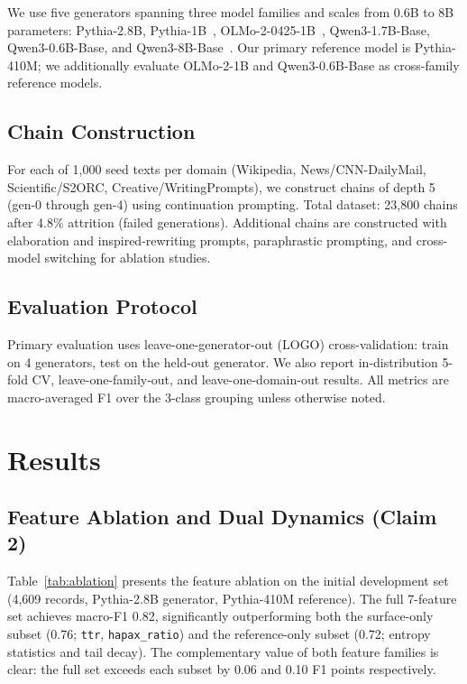 \documentclass[letterpaper]{article}
\newcommand{\feat}[1]{\texttt{#1}}
\begin{document}
We use five generators spanning three model families and scales from 0.6B to 8B parameters: Pythia-2.8B, Pythia-1B~\citep{biderman2023pythia}, OLMo-2-0425-1B~\citep{groeneveld2024olmo}, Qwen3-1.7B-Base, Qwen3-0.6B-Base, and Qwen3-8B-Base~\citep{yang2024qwen2}.
Our primary reference model is Pythia-410M; we additionally evaluate OLMo-2-1B and Qwen3-0.6B-Base as cross-family reference models.

\subsection{Chain Construction}

For each of 1{,}000 seed texts per domain (Wikipedia, News/CNN-DailyMail, Scientific/S2ORC, Creative/WritingPrompts), we construct chains of depth 5 (gen-0 through gen-4) using continuation prompting.
Total dataset: 23{,}800 chains after 4.8\% attrition (failed generations).
Additional chains are constructed with elaboration and inspired-rewriting prompts, paraphrastic prompting, and cross-model switching for ablation studies.

\subsection{Evaluation Protocol}

Primary evaluation uses leave-one-generator-out (LOGO) cross-validation: train on 4 generators, test on the held-out generator.
We also report in-distribution 5-fold CV, leave-one-family-out, and leave-one-domain-out results.
All metrics are macro-averaged F1 over the 3-class grouping unless otherwise noted.

\section{Results}

\subsection{Feature Ablation and Dual Dynamics (Claim 2)}
\label{sec:ablation}

Table~\ref{tab:ablation} presents the feature ablation on the initial development set (4{,}609 records, Pythia-2.8B generator, Pythia-410M reference).
The full 7-feature set achieves macro-F1 0.82, significantly outperforming both the surface-only subset (0.76; \feat{ttr}, \feat{hapax\_ratio}) and the reference-only subset (0.72; entropy statistics and tail decay).
The complementary value of both feature families is clear: the full set exceeds each subset by 0.06 and 0.10 F1 points respectively.
\end{document}
